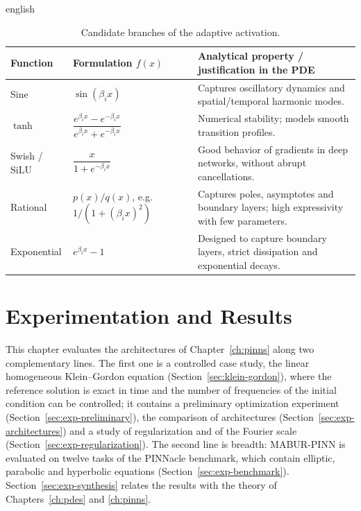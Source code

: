 \documentclass[12pt,letterpaper,twoside]{book}
\begin{document}
\begin{hyphenrules}{english}
\begin{table}[htbp]
  \centering
  \caption{Candidate branches of the adaptive activation.}
  \label{tab:abu-branches}
  \small
  \begin{tabularx}{\linewidth}{@{}llX@{}}
    \toprule
    Function & Formulation $f(x)$ & Analytical property / justification in the PDE \\
    \midrule
    Sine & $\sin(\beta_ix)$ & Captures oscillatory dynamics and spatial/temporal harmonic modes. \\
    $\tanh$ & $\dfrac{e^{\beta_ix}-e^{-\beta_ix}}{e^{\beta_ix}+e^{-\beta_ix}}$ & Numerical stability; models smooth transition profiles. \\
    Swish / SiLU & $\dfrac{x}{1+e^{-\beta_ix}}$ & Good behavior of gradients in deep networks, without abrupt cancellations. \\
    Rational & $p(x)/q(x)$, e.g.\ $1/(1+(\beta_ix)^2)$ & Captures poles, asymptotes and boundary layers; high expressivity with few parameters. \\
    Exponential & $e^{\beta_ix}-1$ & Designed to capture boundary layers, strict dissipation and exponential decays. \\
    \bottomrule
  \end{tabularx}
\end{table}


\chapter{Experimentation and Results}\label{ch:experiments}

This chapter evaluates the architectures of Chapter~\ref{ch:pinns} along two complementary lines. The first
one is a controlled case study, the linear homogeneous Klein--Gordon equation (Section~\ref{sec:klein-gordon}),
where the reference solution is exact in time and the number of frequencies of the initial condition can
be controlled; it contains a preliminary optimization experiment (Section~\ref{sec:exp-preliminary}), the
comparison of architectures (Section~\ref{sec:exp-architectures}) and a study of regularization and of the
Fourier scale (Section~\ref{sec:exp-regularization}). The second line is breadth: MABUR-PINN is evaluated on
twelve tasks of the PINNacle benchmark, which contain elliptic, parabolic and hyperbolic equations
(Section~\ref{sec:exp-benchmark}). Section~\ref{sec:exp-synthesis} relates the results with the theory of
Chapters~\ref{ch:pdes} and \ref{ch:pinns}.


\end{hyphenrules}
\end{document}
